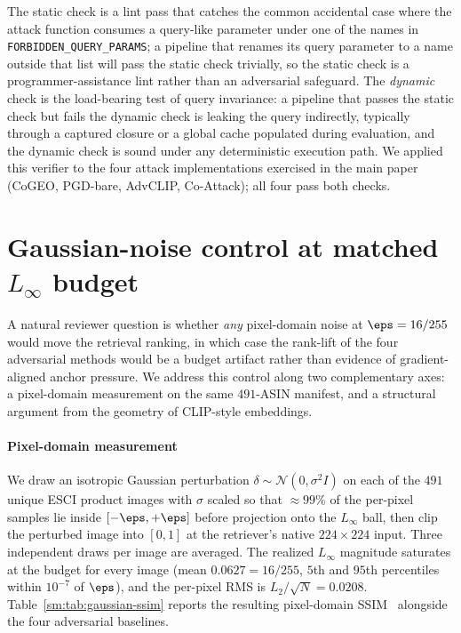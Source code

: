 The static check is a lint pass that catches the common accidental case where the attack function consumes a query-like parameter under one of the names in \texttt{FORBIDDEN\_QUERY\_PARAMS}; a pipeline that renames its query parameter to a name outside that list will pass the static check trivially, so the static check is a programmer-assistance lint rather than an adversarial safeguard. The \emph{dynamic} check is the load-bearing test of query invariance: a pipeline that passes the static check but fails the dynamic check is leaking the query indirectly, typically through a captured closure or a global cache populated during evaluation, and the dynamic check is sound under any deterministic execution path. We applied this verifier to the four attack implementations exercised in the main paper (CoGEO, PGD-bare, AdvCLIP, Co-Attack); all four pass both checks.

\section{\texorpdfstring{Gaussian-noise control at matched $L_\infty$ budget}{Gaussian-noise control at matched L-infinity budget}}
\label{sm:gaussian-noise}

A natural reviewer question is whether \emph{any} pixel-domain noise at $\eps = 16/255$ would move the retrieval ranking, in which case the rank-lift of the four adversarial methods would be a budget artifact rather than evidence of gradient-aligned anchor pressure. We address this control along two complementary axes: a pixel-domain measurement on the same $491$-ASIN manifest, and a structural argument from the geometry of CLIP-style embeddings.

\paragraph{Pixel-domain measurement} We draw an isotropic Gaussian perturbation $\delta \sim \mathcal{N}(0, \sigma^2 I)$ on each of the $491$ unique ESCI product images with $\sigma$ scaled so that $\approx 99\%$ of the per-pixel samples lie inside $[-\eps, +\eps]$ before projection onto the $L_\infty$ ball, then clip the perturbed image into $[0,1]$ at the retriever's native $224 \times 224$ input. Three independent draws per image are averaged. The realized $L_\infty$ magnitude saturates at the budget for every image (mean $0.0627 = 16/255$, $5$th and $95$th percentiles within $10^{-7}$ of $\eps$), and the per-pixel RMS is $L_2/\sqrt{N} = 0.0208$. Table~\ref{sm:tab:gaussian-ssim} reports the resulting pixel-domain SSIM~\cite{wang2004ssim} alongside the four adversarial baselines.

